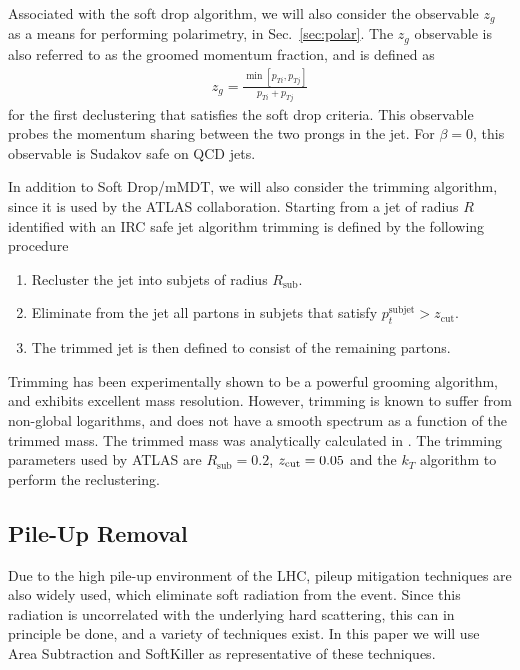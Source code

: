 \documentclass[11pt,letterpaper]{article}
\DeclareRobustCommand{\Sec}[1]{Sec.~\ref{#1}}
\newcommand{\zcut}{z_{\rm cut}}
\begin{document}
Associated with the soft drop algorithm, we will also consider the observable $z_g$ as a means for performing polarimetry, in \Sec{sec:polar}. The $z_g$ observable is also referred to as the groomed momentum fraction, and is defined as
\begin{align}
z_g=\frac{\min\left[ p_{Ti}, p_{Tj}  \right]}{p_{Ti}+p_{Tj}}
\end{align}
for the first declustering that satisfies the soft drop criteria. This observable probes the momentum sharing between the two prongs in the jet. For $\beta=0$, this observable is Sudakov safe on QCD jets.


In addition to Soft Drop/mMDT, we will also consider the trimming algorithm, since it is used by the ATLAS collaboration. Starting from a jet of radius $R$ identified with an IRC safe jet algorithm trimming is defined by the following procedure
\begin{enumerate}
\item Recluster the jet into subjets of radius $R_{\text{sub}}$.
\item Eliminate from the jet all partons in subjets that satisfy $p_t^{\text{subjet}} > z_{\text{cut}}$.
\item The trimmed jet is then defined to consist of the remaining partons.
\end{enumerate}
Trimming has been experimentally shown to be a powerful grooming algorithm, and exhibits excellent mass resolution. However, trimming is known to suffer from non-global logarithms, and does not have a smooth spectrum as a function of the trimmed mass. The trimmed mass was analytically calculated in \cite{Dasgupta:2013ihk}. The trimming parameters used by ATLAS are $R_{\text{sub}}=0.2$,  $ \zcut=0.05$ and the $k_T$ algorithm to perform the reclustering.

\subsection{Pile-Up Removal}\label{sec:pu_tech}


Due to the high pile-up environment of the LHC, pileup mitigation techniques \cite{Cacciari:2007fd,Alon:2011xb,Soyez:2012hv,Tseng:2013dva,Krohn:2013lba,Cacciari:2014gra,Bertolini:2014bba} are also widely used, which eliminate soft radiation from the event. Since this radiation is uncorrelated with the underlying hard scattering, this can in principle be done, and a variety of techniques exist.  In this paper we will use Area Subtraction \cite{Cacciari:2007fd,Cacciari:2008gn} and SoftKiller \cite{Cacciari:2014gra} as representative of these techniques.
\end{document}

